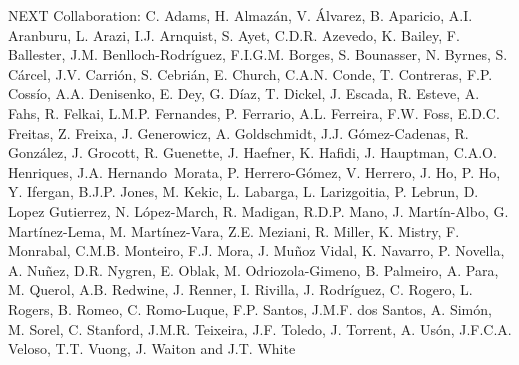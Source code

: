 NEXT Collaboration: C. Adams, H. Almaz\'an, V. \'Alvarez, B. Aparicio, A.I. Aranburu, L. Arazi, I.J. Arnquist, S. Ayet, C.D.R. Azevedo, K. Bailey, F. Ballester, J.M. Benlloch-Rodr\'{i}guez, F.I.G.M. Borges, S. Bounasser, N. Byrnes, S. C\'arcel, J.V. Carri\'on, S. Cebri\'an, E. Church, C.A.N. Conde, T. Contreras, F.P. Coss\'io, A.A. Denisenko, E. Dey, G. D\'iaz, T. Dickel, J. Escada, R. Esteve, A. Fahs, R. Felkai, L.M.P. Fernandes, P. Ferrario, A.L. Ferreira, F.W. Foss, E.D.C. Freitas, Z. Freixa, J. Generowicz, A. Goldschmidt, J.J. G\'omez-Cadenas, R. Gonz\'alez, J. Grocott, R. Guenette, J. Haefner, K. Hafidi, J. Hauptman, C.A.O. Henriques, J.A. Hernando~Morata, P. Herrero-G\'omez, V. Herrero, J. Ho, P. Ho, Y. Ifergan, B.J.P. Jones, M. Kekic, L. Labarga, L. Larizgoitia, P. Lebrun, D. Lopez Gutierrez, N. L\'opez-March, R. Madigan, R.D.P. Mano, J. Mart\'in-Albo, G. Mart\'inez-Lema, M. Mart\'inez-Vara, Z.E. Meziani, R. Miller, K. Mistry, F. Monrabal, C.M.B. Monteiro, F.J. Mora, J. Mu\~noz Vidal, K. Navarro, P. Novella, A. Nu\~{n}ez, D.R. Nygren, E. Oblak, M. Odriozola-Gimeno, B. Palmeiro, A. Para, M. Querol, A.B. Redwine, J. Renner, I. Rivilla, J. Rodr\'iguez, C. Rogero, L. Rogers, B. Romeo, C. Romo-Luque, F.P. Santos, J.M.F. dos Santos, A. Sim\'on, M. Sorel, C. Stanford, J.M.R. Teixeira, J.F. Toledo, J. Torrent, A. Us\'on, J.F.C.A. Veloso, T.T. Vuong, J. Waiton and J.T. White